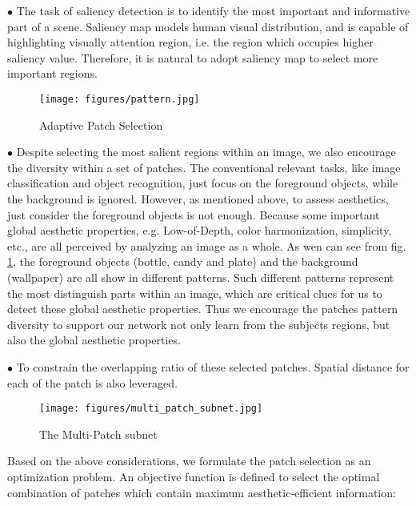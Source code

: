 \documentclass[10pt,twocolumn,letterpaper]{article}
\begin{document}
$\bullet$ The task of saliency detection is to identify the most important and informative part of a scene. Saliency map models human visual distribution,
and is capable of highlighting visually attention region, i.e. the region which
occupies higher saliency value. Therefore, it is natural to adopt saliency map
to select more important regions.

\begin{figure}
	\centering
	\texttt{[image: figures/pattern.jpg]}
	\label{pattern}
	\caption{Adaptive Patch Selection}
\end{figure}

$\bullet$ Despite selecting the most salient regions within an image, we also 
encourage the diversity within a set of patches. 
The conventional relevant tasks, like image classification and object 
recognition, just focus on the foreground objects, while the background 
is ignored. However, as mentioned above, to assess aesthetics, just consider 
the foreground objects is not enough. Because some important global aesthetic 
properties, e.g. Low-of-Depth, color harmonization, simplicity, etc., 
are all perceived by analyzing an image as a whole. 
As wen can see from fig. \ref{pattern}, the foreground objects 
(bottle, candy and plate) and the background (wallpaper) are all 
show in different patterns. Such different patterns represent the 
most distinguish parts within an image, which are critical clues
for us to detect these global aesthetic properties. Thus we encourage
the patches pattern diversity to support our network not only learn from the subjects regions, but also the global aesthetic properties.

$\bullet$ To constrain the overlapping ratio of these selected patches. 
Spatial distance for each of the patch is also leveraged. 

\begin{figure*}
	\centering
	\texttt{[image: figures/multi\_patch\_subnet.jpg]}
	\label{multi_patch}
	\caption{The Multi-Patch subnet}
\end{figure*}

Based on the above considerations, we formulate the patch selection as an 
optimization problem.  An objective function is defined to select the 
optimal combination of patches which contain maximum aesthetic-efficient 
information:
\end{document}
